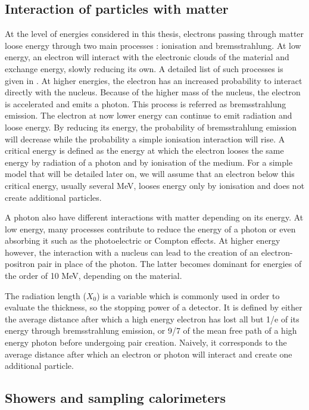 \subsection{Interaction of particles with matter}
\label{sec:org1dd92db}

At the level of energies considered in this thesis, electrons passing through matter loose energy through two main processes : ionisation and bremsstrahlung.
At low energy, an electron will interact with the electronic clouds of the material and exchange energy, slowly reducing its own.
A detailed list of such processes is given in \cite{PDG2016}.
At higher energies, the electron has an increased probability to interact directly with the nucleus.
Because of the higher mass of the nucleus, the electron is accelerated and emits a photon.
This process is referred as bremsstrahlung emission.
The electron at now lower energy can continue to emit radiation and loose energy.
By reducing its energy, the probability of bremsstrahlung emission will decrease while the probability a simple ionisation interaction will rise.
A critical energy is defined as the energy at which the electron looses the same energy by radiation of a photon and by ionisation of the medium.
For a simple model that will be detailed later on, we will assume that an electron below this critical energy, usually several MeV, looses energy only by ionisation and does not create additional particles.

A photon also have different interactions with matter depending on its energy.
At low energy, many processes contribute to reduce the energy of a photon or even absorbing it such as the photoelectric or Compton effects.
At higher energy however, the interaction with a nucleus can lead to the creation of an electron-positron pair in place of the photon.
The latter becomes dominant for energies of the order of 10 MeV, depending on the material.

The radiation length ($X_0$) is a variable which is commonly used in order to evaluate the thickness, so the stopping power of a detector.
It is defined by either the average distance after which a high energy electron has lost all but 1/e of its energy through bremsstrahlung emission, or 9/7 of the mean free path of a high energy photon before undergoing pair creation\cite{PDG2016}.
Naively, it corresponds to the average distance after which an electron or photon will interact and create one additional particle.

\subsection{Showers and sampling calorimeters}
\label{sec:org120de35}

